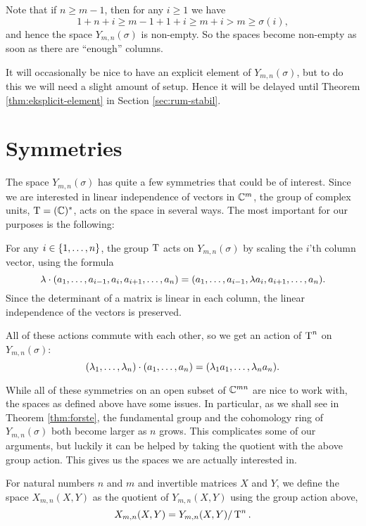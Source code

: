 \begin{remark}
  Note that if $n \geq m-1$, then for any $i\geq 1$ we have
  \[ 1 + n + i \geq m - 1 + 1 +i \geq m+i > m \geq \sigma(i), \] 
  and hence the space $Y_{m,n}(\sigma)$ is non-empty. So the spaces
  become non-empty as
  soon as there are ``enough'' columns.
\end{remark}
It will occasionally be nice to have an explicit element of
$Y_{m,n}(\sigma)$, but to do this we will need a slight amount of
setup. Hence it will be delayed until Theorem
\ref{thm:eksplicit-element} in Section \ref{sec:rum-stabil}.

\section{Symmetries}

The space $Y_{m,n}(\sigma)$ has quite a few symmetries that could be
of interest.
Since we are interested in linear independence of vectors in $\mathbb{C}^m$,
the group of complex units, $\operatorname{T}=(\mathbb{C})^*$, acts on the space 
in several ways. The 
most important for our purposes is the following:
\begin{definition}
  For any $i \in \left\{ 1,\dots,n \right\}$, the group $\operatorname{T}$ acts
  on $Y_{m,n}(\sigma)$ by scaling the $i$'th column vector,
  using the formula
  \[ \lambda \cdot (a_1,\dots,a_{i-1},a_i,a_{i+1},\dots,a_n) =
  (a_1,\dots,a_{i-1},\lambda a_i,a_{i+1},\dots,a_n). \]
  Since the determinant of a matrix is linear in each column, the
  linear independence of the vectors is preserved.

  All of these actions commute with each other, so we get an action of
  $\operatorname{T}^n$ on $Y_{m,n}(\sigma)$:
  \[ (\lambda_1,\dots,\lambda_n) \cdot (a_1,\dots,a_n) = (\lambda_1 a_1,\dots, \lambda_n
  a_n). \]
\end{definition}

While all of these symmetries on an open subset of $\mathbb{C}^{mn}$ are nice
to work with, the spaces as defined above have some issues. In
particular, as we shall see in Theorem \ref{thm:forste}, the
fundamental group and the cohomology ring of
$Y_{m,n}(\sigma)$ both become larger as $n$ grows. This complicates
some of our arguments, but luckily it can be helped by taking the
quotient with the above group action. This gives us the spaces we are
actually interested in.

\begin{definition}
  For natural numbers $n$ and $m$ and invertible matrices $X$ and $Y$,
  we define the space $X_{m,n}(X,Y)$ as the quotient of $Y_{m,n}(X,Y)$
  using the group action above,
  \[ X_{m,n}(X,Y) = Y_{m,n}(X,Y) / \operatorname{T}^n. \]
\end{definition}


